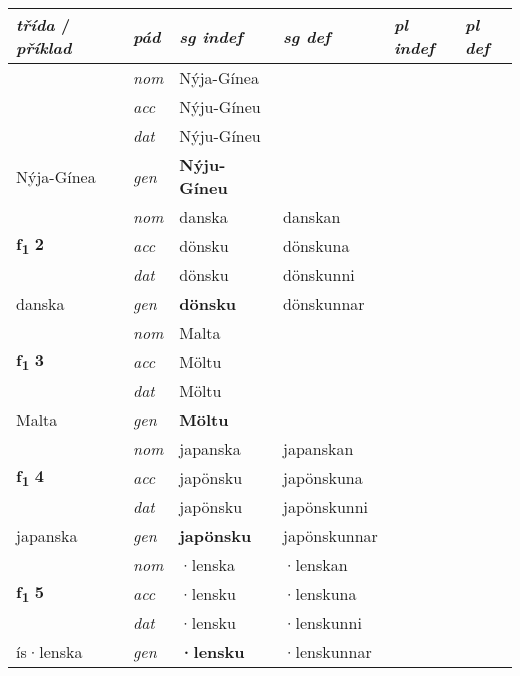 \begin{longtable}[l]{X>{\footnotesize\itshape}XXXXX}
\toprule
{\textbf{\textit{třída}} / \textit{příklad}} & {\textit{pád}} & {\textit{sg indef}} & {\textit{sg def}} & {\textit{pl indef}} & {\textit{pl def}}\\ \midrule
\endhead
\bottomrule
\endfoot
\multirow{3}{*}{{{\textbf{f{\textsubscript{1}}} \Large{\textbf{1}}}}} & nom & Nýja-Gínea &  & \textbf{} &  \\*
 & acc & Nýju-Gíneu &  &  &  \\*
 & dat & Nýju-Gíneu &  &  &  \\*
 {\footnotesize{Nýja-Gínea}} & gen & \textbf{Nýju-Gíneu} &  &  &  \\
\cmidrule{1-6}

\multirow{3}{*}{{{\textbf{f{\textsubscript{1}}} \Large{\textbf{2}}}}} & nom & danska & danskan & \textbf{} &  \\*
 & acc & dönsku & dönskuna &  &  \\*
 & dat & dönsku & dönskunni &  &  \\*
 {\footnotesize{danska}} & gen & \textbf{dönsku} & dönskunnar &  &  \\
\cmidrule{1-6}

\multirow{3}{*}{{{\textbf{f{\textsubscript{1}}} \Large{\textbf{3}}}}} & nom & Malta &  & \textbf{} &  \\*
 & acc & Möltu &  &  &  \\*
 & dat & Möltu &  &  &  \\*
 {\footnotesize{Malta}} & gen & \textbf{Möltu} &  &  &  \\
\cmidrule{1-6}

\multirow{3}{*}{{{\textbf{f{\textsubscript{1}}} \Large{\textbf{4}}}}} & nom & japanska & japanskan & \textbf{} &  \\*
 & acc & japönsku & japönskuna &  &  \\*
 & dat & japönsku & japönskunni &  &  \\*
 {\footnotesize{japanska}} & gen & \textbf{japönsku} & japönskunnar &  &  \\
\cmidrule{1-6}

\multirow{3}{*}{{{\textbf{f{\textsubscript{1}}} \Large{\textbf{5}}}}} & nom & ·lenska & ·lenskan & \textbf{} &  \\*
 & acc & ·lensku & ·lenskuna &  &  \\*
 & dat & ·lensku & ·lenskunni &  &  \\*
 {\footnotesize{ís\allowbreak ·lenska}} & gen & \textbf{·lensku} & ·lenskunnar &  &  \\
\cmidrule{1-6}


\end{longtable}
